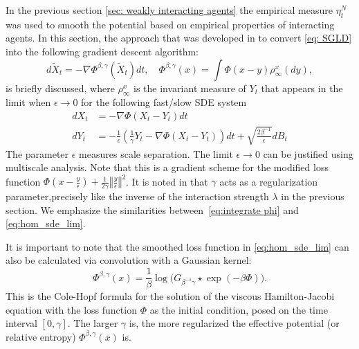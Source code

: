 \documentclass{article}
\begin{document}
In the previous section \ref{sec: weakly interacting agents} the empirical measure $\eta_{t}^{N}$ was used
to smooth the potential based on empirical properties of interacting
agents. In this section, the approach that
was developed in \cite{Chaudhari2017DeepRP} to convert \ref{eq: SGLD}
into the following gradient descent algorithm: 
\begin{equation}
d\tilde{X}_{t}=-\nabla\Phi^{\beta,\gamma}(\tilde{X}_{t})dt,\quad\Phi^{\beta,\gamma}\left(x\right)=\int\Phi(x-y)\rho_{\infty}^{x}(dy),\label{eq:hom_sde_lim}
\end{equation}
is briefly discussed, where $\rho_{\infty}^{x}$ is the invariant measure of $Y_{t}$ that
appears in the limit when $\epsilon\rightarrow0$ for the following
fast/slow SDE system \begin{subequations}\label{eq:hom_sde_v2} 
\begin{align}
dX_{t} & =-\nabla\Phi(X_{t}-Y_{t})dt\label{eq:hom_sde_v2_1}\\
dY_{t} & =-\frac{1}{\epsilon}\left(\frac{1}{\gamma}Y_{t}-\nabla\Phi(X_{t}-Y_{t})\right)dt+\sqrt{\frac{2\beta^{-1}}{\epsilon}}dB_{t}\label{eq:hom_sde_v2_2}
\end{align}
\end{subequations}The parameter $\epsilon$ measures scale separation.
The limit $\epsilon\rightarrow0$ can be justified using multiscale
analysis. Note that this is a gradient
scheme for the modified loss function $\Phi(x-\frac{y}{\epsilon})+\frac{1}{2\gamma}\left\Vert \frac{y}{\epsilon}\right\Vert ^{2}$.
It is noted in \cite{kantas2019sharpflatshallowweakly} that $\gamma$ acts as a regularization parameter,precisely like the inverse of the interaction strength $\lambda$
in the previous section. We emphasize the similarities between~\ref{eq:integrate phi}
and \ref{eq:hom_sde_lim}.

It is important to note that the smoothed loss function in \ref{eq:hom_sde_lim}
can also be calculated via convolution with a Gaussian kernel: 
\begin{equation}
\Phi^{\beta,\gamma}(x)=\frac{1}{\beta}\log\Big(G_{\beta^{-1}\gamma}\star\exp(-\beta\Phi)\Big).\label{e:phi-cole-hopf}
\end{equation}
This is the Cole-Hopf formula for the solution of the viscous Hamilton-Jacobi
equation with the loss function $\Phi$ as the initial condition,
posed on the time interval $[0,\gamma]$. The larger $\gamma$ is,
the more regularized the effective potential (or relative entropy)
$\Phi^{\beta,\gamma}(x)$ is. \\ 
\end{document}
